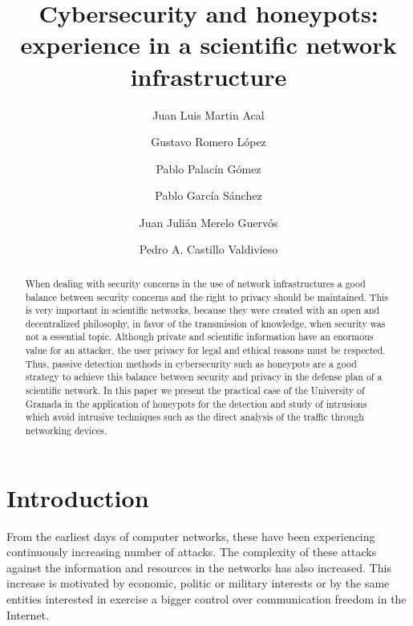 \documentclass[a4paper]{llncs}
\begin{document}
	\pagestyle{empty}

	\mainmatter

	\title{Cybersecurity and honeypots: experience in a scientific network infrastructure} 


	\author{Juan Luis Martin Acal \and Gustavo Romero López \and Pablo Palacín Gómez \and Pablo García Sánchez \and Juan Julián Merelo Guervós \and Pedro A. Castillo Valdivieso }



	\maketitle

\begin{abstract}
When dealing with security concerns in the use of network infrastructures a good balance between security concerns and the right to privacy should be maintained. This is very important in scientific networks, because they were created with an open and decentralized philosophy, in favor of the transmission of knowledge, when security was not a essential topic.
Although private and scientific information have an enormous value for an attacker, the user privacy for legal and ethical reasons must be respected. Thus, passive detection methods in cybersecurity such as honeypots are a good strategy to achieve this balance between security and privacy in the defense plan of a scientific network. In this paper we present the practical case of the University of Granada in the application of honeypots for the detection and study of intrusions which avoid intrusive techniques such as the direct analysis of the traffic through networking devices.
\end{abstract}


\section{Introduction}
From the earliest days of computer networks, these have been experiencing continuously increasing number of attacks\cite{esset-tendencias,cni-ccn-tendencias-2014,cni-ccn-tendencias-2015}. The complexity of these attacks against the information and resources in the networks has also increased. This increase is motivated by economic, politic or military interests or by the same entities interested in exercise a bigger control over communication freedom in the Internet\cite{cni-ccn-tendencias-2015,cisco-2014}.
\end{document}
